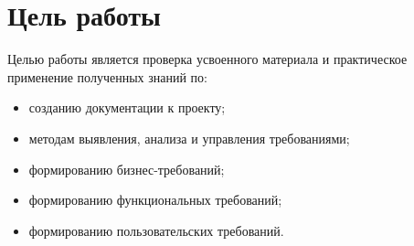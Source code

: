 \chapter*{Цель работы}
\label{ch:the_goal}

Целью работы является проверка усвоенного материала и практическое применение полученных знаний по:
\begin{itemize}
    \item созданию документации к проекту;
    \item методам выявления, анализа и управления требованиями;
    \item формированию бизнес-требований;
    \item формированию функциональных требований;
    \item формированию пользовательских требований.
\end{itemize}
\endinput
